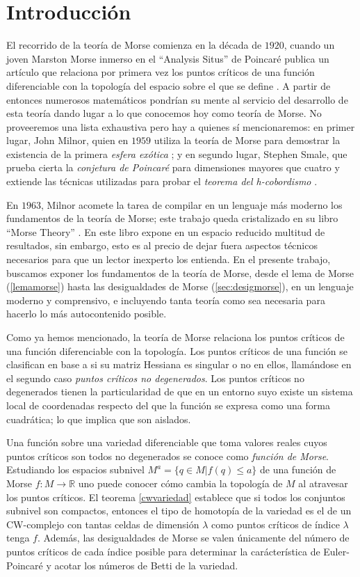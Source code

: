 \chapter*{Introducción}

El recorrido de la teoría de Morse comienza en la década de $1920$, cuando un joven Marston Morse inmerso en el ``Analysis Situs'' de Poincaré publica un artículo que relaciona por primera vez los puntos críticos de una función diferenciable con la topología del espacio sobre el que se define \cite{BottMarstonMorse}. A partir de entonces numerosos matemáticos pondrían su mente al servicio del desarrollo de esta teoría dando lugar a lo que conocemos hoy como teoría de Morse. No proveeremos una lista exhaustiva pero hay a quienes sí mencionaremos: en primer lugar, John Milnor, quien en $1959$ utiliza la teoría de Morse para demostrar la existencia de la primera \textit{esfera exótica} \cite{milnor2010manifolds}; y en segundo lugar, Stephen Smale, que prueba cierta la \textit{conjetura de Poincaré} para dimensiones mayores que cuatro y extiende las técnicas utilizadas para probar el \textit{teorema del h-cobordismo} \cite{bott1988morse}.

En $1963$, Milnor acomete la tarea de compilar en un lenguaje más moderno los fundamentos de la teoría de Morse; este trabajo queda cristalizado en su libro ``Morse Theory'' \cite{milnor1963}. En este libro expone en un espacio reducido multitud de resultados, sin embargo, esto es al precio de dejar fuera aspectos técnicos necesarios para que un lector inexperto los entienda. En el presente trabajo, buscamos exponer los fundamentos de la teoría de Morse, desde el lema de Morse (\ref{lemamorse}) hasta las desigualdades de Morse (\ref{sec:desigmorse}), en un lenguaje moderno y comprensivo, e incluyendo tanta teoría como sea necesaria para hacerlo lo más autocontenido posible. 

Como ya hemos mencionado, la teoría de Morse relaciona los puntos críticos de una función diferenciable con la topología. Los puntos críticos de una función se clasifican en base a si su matriz Hessiana es singular o no en ellos, llamándose en el segundo caso \textit{puntos críticos no degenerados}. Los puntos críticos no degenerados tienen la particularidad de que en un entorno suyo existe un sistema local de coordenadas respecto del que la función se expresa como una forma cuadrática; lo que implica que son aislados.

Una función sobre una variedad diferenciable que toma valores reales cuyos puntos críticos son todos no degenerados se conoce como \textit{función de Morse}. Estudiando los espacios subnivel $M^a=\{q\in M| f(q)\le a\}$ de una función de Morse $f:M\to\mathbb{R}$ uno puede conocer cómo cambia la topología de $M$ al atravesar los puntos críticos. El teorema \ref{cwvariedad} establece que si todos los conjuntos subnivel son compactos, entonces el tipo de homotopía de la variedad es el de un CW-complejo con tantas celdas de dimensión $\lambda$ como puntos críticos de índice $\lambda$ tenga $f$. Además, las desigualdades de Morse se valen únicamente del número de puntos críticos de cada índice posible para determinar la carácterística de Euler-Poincaré y acotar los números de Betti de la variedad.

